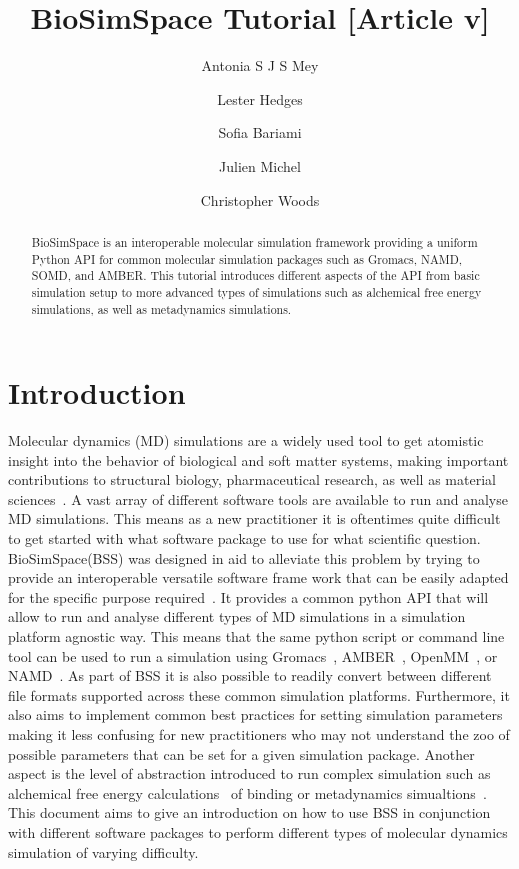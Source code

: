 \documentclass[9pt,tutorial]{livecoms}
\title{BioSimSpace Tutorial [Article v\versionnumber]}
\author[1*]{Antonia S J S Mey}
\author[1,2\authfn{1}\authfn{3}]{Lester Hedges}
\author[1]{Sofia Bariami}
\author[2\authfn{1}\authfn{4}]{Julien Michel}
\author[2*]{Christopher Woods}
\affil[1]{Edinburgh}
\affil[2]{Institution 2}
\begin{document}
\begin{frontmatter}
\maketitle

\begin{abstract}
BioSimSpace is an interoperable molecular simulation framework providing a uniform Python API for common molecular simulation packages such as Gromacs, NAMD, SOMD, and AMBER. This tutorial introduces different aspects of the API from basic simulation setup to more advanced types of simulations such as alchemical free energy simulations, as well as metadynamics simulations. 
\end{abstract}

\end{frontmatter}



\section{Introduction}
\label{sec:intro}
Molecular dynamics (MD) simulations are a widely used tool to get atomistic insight into the behavior of biological and soft matter systems, making important contributions to structural biology, pharmaceutical research, as well as material sciences~\cite{huggins2019biomolecular, rountree2002atomistic}. A vast array of different software tools are available to run and analyse MD simulations. This means as a new practitioner it is oftentimes quite difficult to get started with what software package to use for what scientific question. 
BioSimSpace(BSS) was designed in aid to alleviate this problem by trying to provide an interoperable versatile software frame work that can be easily adapted for the specific purpose required~\cite{hedges2019biosimspace}. It provides a common python API that will allow to run and analyse different types of MD simulations in a simulation platform agnostic way. This means that the same python script or command line tool can be used to run a simulation using Gromacs~\cite{vanderspoel2005gromacs}, AMBER~\cite{}, OpenMM~\cite{eastman2017openmm}, or NAMD~\cite{phillips2005scalable}. As part of BSS it is also possible to readily convert between different file formats supported across these common simulation platforms. Furthermore, it also aims to implement common best practices for setting simulation parameters making it less confusing for new practitioners who may not understand the zoo of possible parameters that can be set for a given simulation package. Another aspect is the level of abstraction introduced to run complex simulation such as alchemical free energy calculations~\cite{} of binding or metadynamics simualtions~\cite{}. This document aims to give an introduction on how to use BSS in conjunction with different software packages to perform different types of molecular dynamics simulation of varying difficulty.
\end{document}
